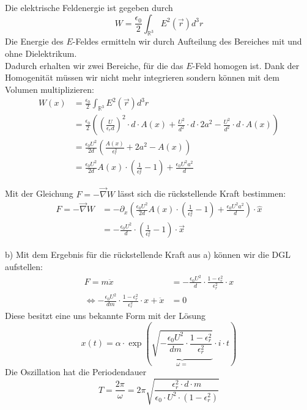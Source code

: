 \documentclass[11pt a4paper]{article}
\newcommand{\epsz}{\epsilon_0}
\begin{document}
Die elektrische Feldenergie ist gegeben durch
\[
	W = \frac{\epsz}{2} \int_{\mathbb{R}^3} E^2(\vec r) d^3r 
\]
Die Energie des $E$-Feldes ermitteln wir durch Aufteilung des Bereiches
mit und ohne Dielektrikum.\\
Dadurch erhalten wir zwei Bereiche, für die das $E$-Feld homogen ist. Dank
der Homogenität müssen wir nicht mehr integrieren sondern können mit dem 
Volumen multiplizieren:
\begin{align*}
	W(x) &= \frac{\epsz}{2} \int_{\mathbb{R}^3} E^2(\vec r) d^3r \\
	&= \frac{\epsz}{2} \left(
		\left(\frac{U}{\epsilon_r d}\right)^2 \cdot d \cdot A(x) +
		\frac{U^2}{d^2} \cdot d \cdot 2a^2 -
		\frac{U^2}{d^2} \cdot d \cdot A(x) \right) \\
	&= \frac{\epsz U^2}{2d} 
	\left( \frac{A(x)}{\epsilon_r^2} + 2a^2 - A(x) \right)\\
	&= \frac{\epsz U^2}{2d} A(x) 
	\cdot \left(\frac{1}{\epsilon_r^2} -1\right) +
	\frac{\epsz U^2 a^2}{d}
\end{align*}

\newpage
\setlength{\headheight}{0cm}

Mit der Gleichung $F = -\vec\nabla W$ lässt sich die rückstellende Kraft
bestimmen:
\begin{align*}
	F = -\vec\nabla W &= -\partial_x \left(
	\frac{\epsz U^2}{2d} A(x) 
	\cdot \left(\frac{1}{\epsilon_r^2} -1\right) +
	\frac{\epsz U^2 a^2}{d} 
	\right) \cdot \hat x\\
	&= -\frac{\epsz U^2}{d} \cdot \left(\frac{1}{\epsilon_r^2} -1
	\right) \cdot \vec x
\end{align*}

b) Mit dem Ergebnis für die rückstellende Kraft aus a) können wir die DGL 
aufstellen:
\begin{align*}
	F = m\ddot x
	&= -\frac{\epsz U^2}{d} \cdot \frac{1 - \epsilon_r^2}{\epsilon_r^2}
	\cdot x \\
	\Leftrightarrow
	-\frac{\epsz U^2}{dm} \cdot \frac{1 - \epsilon_r^2}{\epsilon_r^2}
	\cdot x + \ddot x &= 0
\end{align*}
Diese besitzt eine uns bekannte Form mit der Lösung
\[
	x(t) = \alpha \cdot \exp\left(
	\underbrace{
	\sqrt{-\frac{\epsz U^2}{dm} \cdot \frac{1 - \epsilon_r^2}
	{\epsilon_r^2}}}_{\omega =}  \cdot i \cdot t \right)
\]
Die Oszillation hat die Periodendauer
\[
	T = \frac{2\pi}{\omega} = 2\pi \sqrt{\frac
	{\epsilon_r^2 \cdot d \cdot m}
	{\epsz \cdot U^2 \cdot (1 - \epsilon_r^2)}}
\]
\newpage
\end{document}
